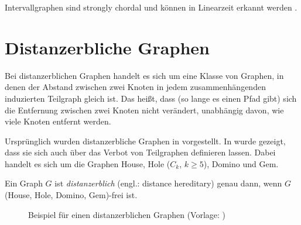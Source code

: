 Intervallgraphen sind strongly chordal \cite[Abschnitt~4.4]{brandstaedt1999graph}\cite{FarberPhD} und können in Linearzeit erkannt werden \cite{Booth1976}.

\section{Distanzerbliche Graphen}
Bei distanzerblichen Graphen handelt es sich um eine Klasse von Graphen, in denen der Abstand zwischen zwei Knoten in jedem zusammenhängenden induzierten Teilgraph gleich ist. Das heißt, dass (so lange es einen Pfad gibt) sich die Entfernung zwischen zwei Knoten nicht verändert, unabhängig davon, wie viele Knoten entfernt werden.

Ursprünglich wurden distanzerbliche Graphen in \cite{Howorka1977} vorgestellt. In \cite{Bandelt1986} wurde gezeigt, dass sie sich auch über das Verbot von Teilgraphen definieren lassen. Dabei handelt es sich um die Graphen House, Hole ($C_k$, $k\geq 5$), Domino und Gem.

\begin{mydef}
    Ein Graph $G$ ist \emph{distanzerblich} (engl.: distance hereditary) genau dann, wenn $G$ (House, Hole, Domino, Gem)-frei ist.
\end{mydef}

\begin{figure}[htbp]
    \centering
    
    
    \caption[Beispiel für einen distanzerblichen Graphen]{Beispiel für einen distanzerblichen Graphen (Vorlage: \cite{wikiMedia:DistanceHereditaryGraph})}
    \label{pic:bsp_DistanceHereditaryGraph}
\end{figure}


